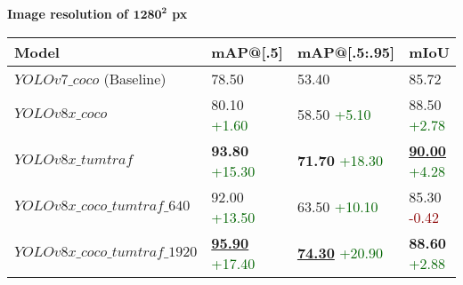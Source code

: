 \begin{table}[htb]
	\begin{minipage}{\textwidth}
		\centering
		\textbf{Image resolution of $\bm{1280^2}$ px} \\
		\begin{tabular}{llll}
			\toprule
			\textbf{Model} & \textbf{mAP@[.5]} & \textbf{mAP@[.5:.95]} & \textbf{mIoU} \\
			\midrule
			$YOLOv7\_coco$ (Baseline) & 78.50 & 53.40 & 85.72\\
			$YOLOv8x\_coco$ & 80.10  \scriptsize\textcolor{darkgreen}{+1.60} & 58.50  \scriptsize\textcolor{darkgreen}{+5.10} & 88.50  \scriptsize\textcolor{darkgreen}{+2.78}\\
			$YOLOv8x\_tumtraf$ & \textbf{93.80} \scriptsize\textcolor{darkgreen}{+15.30} & \textbf{71.70} \scriptsize\textcolor{darkgreen}{+18.30} & \textbf{\underline{90.00}} \scriptsize\textcolor{darkgreen}{ +4.28}\\
			$YOLOv8x\_coco\_tumtraf\_640$ & 92.00 \scriptsize\textcolor{darkgreen}{+13.50} & 63.50 \scriptsize\textcolor{darkgreen}{+10.10} & 85.30 \scriptsize\textcolor{darkred}{  -0.42}\\
			$YOLOv8x\_coco\_tumtraf\_1920$ & \textbf{\underline{95.90}} \scriptsize\textcolor{darkgreen}{+17.40} & \textbf{\underline{74.30}} \scriptsize\textcolor{darkgreen}{+20.90} & \textbf{88.60} \scriptsize\textcolor{darkgreen}{+2.88} \\
			\bottomrule
		\end{tabular}
	\end{minipage}
	
	\vspace{2em} %
	

\end{table}
